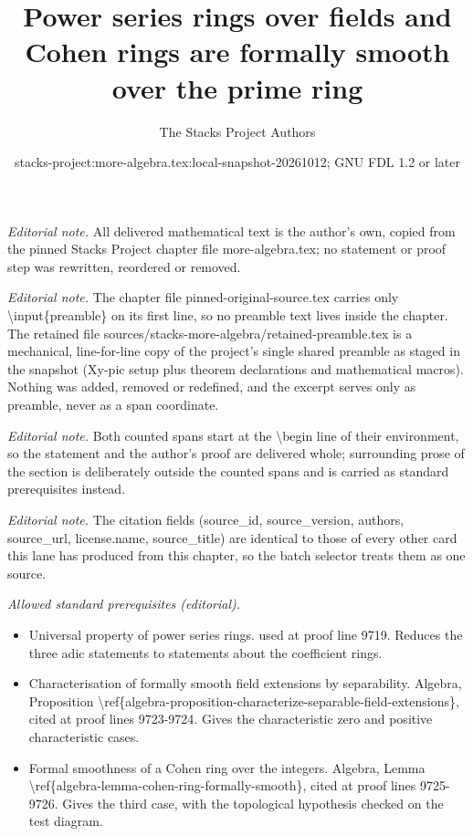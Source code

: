 \documentclass[10pt,a4paper]{amsart}
\title{Power series rings over fields and Cohen rings are formally smooth over the prime ring}
\author{The Stacks Project Authors}
\date{stacks-project:more-algebra.tex:local-snapshot-20261012; GNU FDL 1.2 or later}
\theoremstyle{plain}
\theoremstyle{definition}
\theoremstyle{remark}
\numberwithin{equation}{subsection}
\begin{document}
\maketitle
\setcounter{subsection}{1}
\noindent\textit{Editorial note.} All delivered mathematical text is the author's own, copied from the pinned Stacks Project chapter file more-algebra.tex; no statement or proof step was rewritten, reordered or removed.\par\medskip
\noindent\textit{Editorial note.} The chapter file pinned-original-source.tex carries only \textbackslash{}input\{preamble\} on its first line, so no preamble text lives inside the chapter. The retained file sources/stacks-more-algebra/retained-preamble.tex is a mechanical, line-for-line copy of the project's single shared preamble as staged in the snapshot (Xy-pic setup plus theorem declarations and mathematical macros). Nothing was added, removed or redefined, and the excerpt serves only as preamble, never as a span coordinate.\par\medskip
\noindent\textit{Editorial note.} Both counted spans start at the \textbackslash{}begin line of their environment, so the statement and the author's proof are delivered whole; surrounding prose of the section is deliberately outside the counted spans and is carried as standard prerequisites instead.\par\medskip
\noindent\textit{Editorial note.} The citation fields (source\_id, source\_version, authors, source\_url, license.name, source\_title) are identical to those of every other card this lane has produced from this chapter, so the batch selector treats them as one source.\par\medskip
\noindent\textit{Allowed standard prerequisites (editorial).}\begin{itemize}
\item Universal property of power series rings. used at proof line 9719. Reduces the three adic statements to statements about the coefficient rings.
\item Characterisation of formally smooth field extensions by separability. Algebra, Proposition \textbackslash{}ref\{algebra-proposition-characterize-separable-field-extensions\}, cited at proof lines 9723-9724. Gives the characteristic zero and positive characteristic cases.
\item Formal smoothness of a Cohen ring over the integers. Algebra, Lemma \textbackslash{}ref\{algebra-lemma-cohen-ring-formally-smooth\}, cited at proof lines 9725-9726. Gives the third case, with the topological hypothesis checked on the test diagram.
\end{itemize}\medskip
\end{document}
